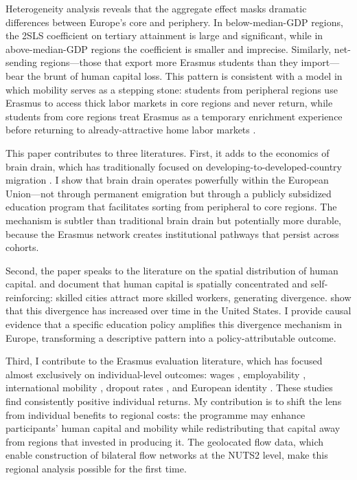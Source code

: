 \documentclass[12pt]{article}
\begin{document}
Heterogeneity analysis reveals that the aggregate effect masks dramatic differences between Europe's core and periphery. In below-median-GDP regions, the 2SLS coefficient on tertiary attainment is large and significant, while in above-median-GDP regions the coefficient is smaller and imprecise. Similarly, net-sending regions---those that export more Erasmus students than they import---bear the brunt of human capital loss. This pattern is consistent with a model in which mobility serves as a stepping stone: students from peripheral regions use Erasmus to access thick labor markets in core regions and never return, while students from core regions treat Erasmus as a temporary enrichment experience before returning to already-attractive home labor markets \citep{faggian_mccann_2009, venhorst_vandijk_vanwissen_2011}.

This paper contributes to three literatures. First, it adds to the economics of brain drain, which has traditionally focused on developing-to-developed-country migration \citep{borjas_1995, borjas_2003, docquier_rapoport_2012, beine_docquier_rapoport_2001, beine_docquier_rapoport_2008}. I show that brain drain operates powerfully within the European Union---not through permanent emigration but through a publicly subsidized education program that facilitates sorting from peripheral to core regions. The mechanism is subtler than traditional brain drain but potentially more durable, because the Erasmus network creates institutional pathways that persist across cohorts.

Second, the paper speaks to the literature on the spatial distribution of human capital. \citet{moretti_2004} and \citet{glaeser_saiz_2004} document that human capital is spatially concentrated and self-reinforcing: skilled cities attract more skilled workers, generating divergence. \citet{berry_glaeser_2005} show that this divergence has increased over time in the United States. I provide causal evidence that a specific education policy amplifies this divergence mechanism in Europe, transforming a descriptive pattern into a policy-attributable outcome.

Third, I contribute to the Erasmus evaluation literature, which has focused almost exclusively on individual-level outcomes: wages \citep{sorrenti_2025}, employability \citep{di_pietro_2019, granato_etal_2024}, international mobility \citep{parey_waldinger_2011, oosterbeek_webbink_2011}, dropout rates \citep{di_pietro_2015}, and European identity \citep{cattaneo_wolter_2018}. These studies find consistently positive individual returns. My contribution is to shift the lens from individual benefits to regional costs: the programme may enhance participants' human capital and mobility while redistributing that capital away from regions that invested in producing it. The \citet{vaisanen_2025} geolocated flow data, which enable construction of bilateral flow networks at the NUTS2 level, make this regional analysis possible for the first time.
\end{document}
